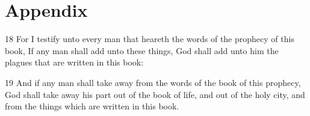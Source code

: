 \chapter{Appendix}

18 For I testify unto every man that heareth the words of the
prophecy of this book, If any man shall add unto these things, God
shall add unto him the plagues that are written in this book:

19 And if any man shall take away from the words of the book of
this prophecy, God shall take away his part out of the book of
life, and out of the holy city, and from the things which are
written in this book.
